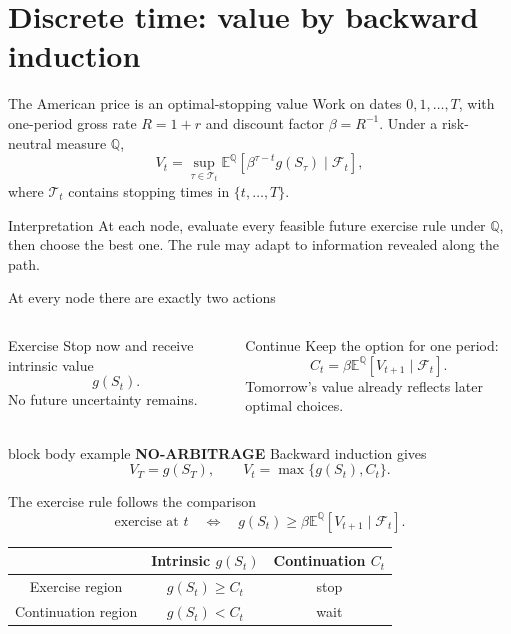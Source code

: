 \documentclass[handout,10pt,aspectratio=169]{beamer}
\newenvironment{marketbox}{\begin{beamercolorbox}[rounded=true,sep=0.7em,wd=\textwidth]{block body example}
  \textbf{\color{CourseGreen}NO-ARBITRAGE}\quad}{\end{beamercolorbox}}
\newcommand{\E}{\mathbb E}
\newcommand{\Q}{\mathbb Q}
\newcommand{\cF}{\mathcal F}
\begin{document}
\section{Discrete time: value by backward induction}

\begin{frame}{The American price is an optimal-stopping value}
Work on dates \(0,1,\ldots,T\), with one-period gross rate \(R=1+r\) and
discount factor \(\beta=R^{-1}\). Under a risk-neutral measure \(\Q\),
\[
\boxed{V_t=\operatorname*{sup}_{\tau\in\mathcal T_t}
  \E^\Q\!\left[\beta^{\tau-t}g(S_\tau)\mid\cF_t\right],}
\]
where \(\mathcal T_t\) contains stopping times in \(\{t,\ldots,T\}\).
\begin{block}{Interpretation}
At each node, evaluate every feasible future exercise rule under \(\Q\), then
choose the best one. The rule may adapt to information revealed along the path.
\end{block}
\end{frame}

\begin{frame}{At every node there are exactly two actions}
\begin{columns}[T,onlytextwidth]
\begin{block}{Exercise}
Stop now and receive intrinsic value
\[
  \boxed{g(S_t).}
\]
No future uncertainty remains.
\end{block}
\begin{exampleblock}{Continue}
Keep the option for one period:
\[
  \boxed{C_t=\beta\E^\Q[V_{t+1}\mid\cF_t].}
\]
Tomorrow's value already reflects later optimal choices.
\end{exampleblock}
\end{columns}
\begin{marketbox}
Backward induction gives
\[
\boxed{V_T=g(S_T),\qquad V_t=\max\{g(S_t),C_t\}.}
\]
\end{marketbox}
\end{frame}

\begin{frame}{The exercise rule follows the comparison}
\[
\text{exercise at }t
\quad\Longleftrightarrow\quad
g(S_t)\geq \beta\E^\Q[V_{t+1}\mid\cF_t].
\]
\begin{center}
\begin{tabular}{c|c|c}
\toprule
 & Intrinsic \(g(S_t)\) & Continuation \(C_t\)\\
\midrule
Exercise region & \(g(S_t)\geq C_t\) & stop\\
Continuation region & \(g(S_t)<C_t\) & wait\\
\bottomrule
\end{tabular}
\end{center}
\end{frame}
\end{document}
